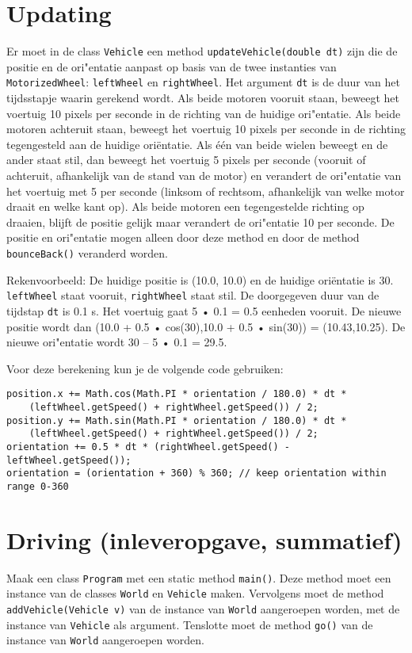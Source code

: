 \documentclass[a4paper,10pt]{article}
\newcommand{\code}[1]{\texttt{#1}}
\begin{document}
\section{Updating}
Er moet in de class \code{Vehicle} een method \code{updateVehicle(double dt)} zijn die de positie en de ori"entatie aanpast op basis van de twee instanties van \code{MotorizedWheel}: \code{leftWheel} en \code{rightWheel}. Het argument \code{dt} is de duur van het tijdsstapje waarin gerekend wordt. Als beide motoren vooruit staan, beweegt het voertuig 10 pixels per seconde in de richting van de huidige ori"entatie. Als beide motoren achteruit staan, beweegt het voertuig 10 pixels per seconde in de richting tegengesteld aan de huidige oriëntatie. Als één van beide wielen beweegt en de ander staat stil, dan beweegt het voertuig 5 pixels per seconde (vooruit of achteruit, afhankelijk van de stand van de motor) en verandert de ori"entatie van het voertuig met 5\textdegree{} per seconde (linksom of rechtsom, afhankelijk van welke motor draait en welke kant op). Als beide motoren een tegengestelde richting op draaien, blijft de positie gelijk maar verandert de ori"entatie 10\textdegree{} per seconde. De positie en ori"entatie mogen alleen door deze method en door de method \code{bounceBack()} veranderd worden.

Rekenvoorbeeld: De huidige positie is (10.0, 10.0) en de huidige oriëntatie is 30\textdegree{}. \code{leftWheel} staat vooruit, \code{rightWheel} staat stil. De doorgegeven duur van de tijdstap \code{dt} is 0.1 s. Het voertuig gaat 5 • 0.1 = 0.5 eenheden vooruit. De nieuwe positie wordt dan (10.0 + 0.5 • cos(30\textdegree{}),10.0 + 0.5 • sin(30\textdegree{})) = (10.43,10.25). De nieuwe ori"entatie wordt 30\textdegree{} -- 5\textdegree{} • 0.1 = 29.5\textdegree{}.

Voor deze berekening kun je de volgende code gebruiken:
\begin{lstlisting}
position.x += Math.cos(Math.PI * orientation / 180.0) * dt * 
	(leftWheel.getSpeed() + rightWheel.getSpeed()) / 2;
position.y += Math.sin(Math.PI * orientation / 180.0) * dt * 
	(leftWheel.getSpeed() + rightWheel.getSpeed()) / 2;
orientation += 0.5 * dt * (rightWheel.getSpeed() - leftWheel.getSpeed());
orientation = (orientation + 360) % 360; // keep orientation within range 0-360
\end{lstlisting}
\section{Driving (inleveropgave, summatief)}
Maak een class \code{Program} met een static method \code{main()}. Deze method moet een instance van de classes \code{World} en \code{Vehicle} maken. Vervolgens moet de method \code{addVehicle(Vehicle v)} van de instance van \code{World} aangeroepen worden, met de instance van \code{Vehicle} als argument. Tenslotte moet de method \code{go()} van de instance van \code{World} aangeroepen worden.
\end{document}
